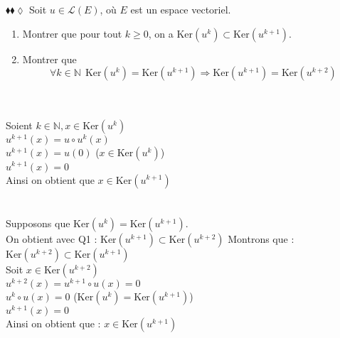 \documentclass[11pt]{article}
\newcommand*{\N}{\mathbb{N}}
\renewcommand*{\ker}{\textrm{Ker}}
\begin{document}
\begin{exercise}{$\blacklozenge\blacklozenge\lozenge$}{}
    Soit $u \in \mathcal{L}(E)$, où $E$ est un espace vectoriel.
     \begin{enumerate}[topsep=0pt,itemsep=-0.9 ex]
        \item Montrer que pour tout $k \geq 0$, on a $\ker{(u^{k})} \subset \ker{(u^{k+1})}$.
        \item Montrer que
        \begin{equation*}
            \forall k \in \N ~~ \ker{(u^{k})} = \ker{(u^{k+1})} \Rightarrow \ker{(u^{k+1})} = \ker{(u^{k+2})}
        \end{equation*}
    \end{enumerate}
    \tcblower\\[0.2cm]
    \\
    Soient $k \in \N, x \in \ker{(u^{k})}$\\
    $u^{k+1}{(x)} = u \circ u^{k}{(x)}$\\
    $u^{k+1}{(x)} = u{(0)}$ ($x \in \ker{(u^{k})}$)\\
    $u^{k+1}{(x)} = 0$\\
    Ainsi on obtient que $x \in \ker{(u^{k+1})}$\\\\
    \\
    \fbox{$\Rightarrow$} Supposons que $\ker{(u^{k})} = \ker{(u^{k+1})}$.\\
    On obtient avec Q1 : $\ker{(u^{k+1})} \subset \ker{(u^{k+2})}$
    Montrons que : $\ker{(u^{k+2})} \subset \ker{(u^{k+1})}$\\
    Soit $x \in \ker{(u^{k+2})}$\\
    $u^{k+2}{(x)} = u^{k+1} \circ u{(x)} = 0$\\
    $u^{k} \circ u{(x)} = 0$ ($\ker{(u^{k})} = \ker{(u^{k+1})}$)\\
    $u^{k+1}{(x)} = 0$\\
    Ainsi on obtient que : $x \in \ker{(u^{k+1})}$
\end{exercise}
\end{document}
